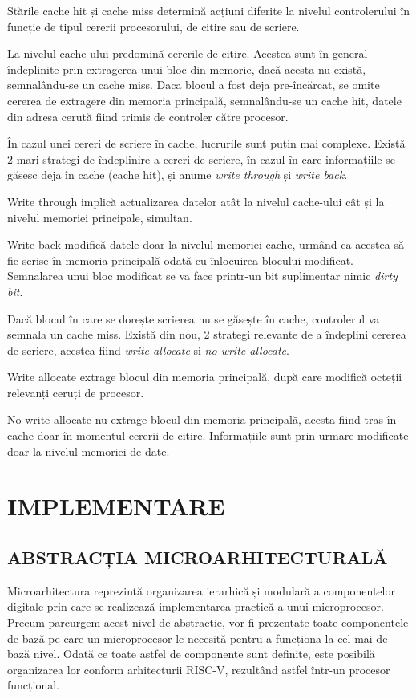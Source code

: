 \documentclass[12pt]{article}
\begin{document}
 Stările cache hit și cache miss determină acțiuni diferite la nivelul controlerului în funcție de tipul cererii procesorului, de citire sau de scriere.
 
La nivelul cache-ului predomină cererile de citire. Acestea sunt în general îndeplinite prin extragerea unui bloc din memorie, dacă acesta nu există, semnalându-se un cache miss. Daca blocul a fost deja pre-încărcat, se omite cererea de extragere din memoria principală, semnalându-se un cache hit, datele din adresa cerută fiind trimis de controler către procesor.

În cazul unei cereri de scriere în cache, lucrurile sunt puțin mai complexe. Există 2 mari strategi de îndeplinire a cereri de scriere, în cazul în care informațiile se găsesc deja în cache (cache hit), și anume \textit{write through} și \textit{write back}.

Write through implică actualizarea datelor atât la nivelul cache-ului cât și la nivelul memoriei principale, simultan.

Write back modifică datele doar la nivelul memoriei cache, urmând ca acestea să fie scrise în memoria principală odată cu înlocuirea blocului modificat. Semnalarea unui bloc modificat se va face printr-un bit suplimentar nimic \textit{dirty bit}.

Dacă blocul în care se dorește scrierea nu se găsește în cache, controlerul va semnala un cache miss. Există din nou, 2 strategi relevante de a îndeplini cererea de scriere, acestea fiind \textit{write allocate} și \textit{no write allocate}.

Write allocate extrage blocul din memoria principală, după care modifică octeții relevanți ceruți de procesor.

No write allocate nu extrage blocul din memoria principală, acesta fiind tras în cache doar în momentul cererii de citire. Informațiile sunt prin urmare modificate doar la nivelul memoriei de date.


\newpage
\section{\centering IMPLEMENTARE}
\bigbreak
\subsection{ABSTRACȚIA MICROARHITECTURALĂ}
Microarhitectura reprezintă organizarea ierarhică și modulară a componentelor digitale prin care se realizează implementarea practică a unui microprocesor. Precum parcurgem acest nivel de abstracție, vor fi prezentate toate componentele de bază pe care un microprocesor le necesită pentru a funcționa la cel mai de bază nivel. Odată ce toate astfel de componente sunt definite, este posibilă organizarea lor conform arhitecturii RISC-V, rezultând astfel într-un procesor funcțional.
\end{document}
